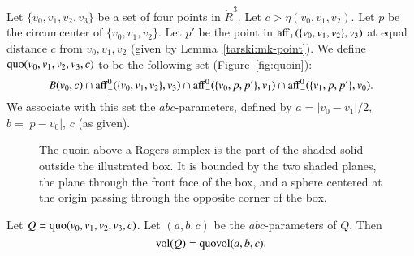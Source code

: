 \begin{definition}\label{def:quoin}
Let $\{v_0,v_1,v_2,v_3\}$ be a set of four points in $\ring{R}^3$.
Let $c>  \eta(v_0,v_1,v_2)$.  Let $p$ be the circumcenter
of $\{v_0,v_1,v_2\}$.  Let $p'$ be the point 
in ${\operatorname{aff}}_+(\{v_0,v_1,v_2\},v_3)$ at equal distance $c$
from $v_0,v_1,v_2$ (given by Lemma~\ref{tarski:mk-point}).
We define
${\operatorname{quo}}(v_0,v_1,v_2,v_3,c)$ to be the following set 
(Figure~\ref{fig:quoin}):
   $$
   B(v_0,c) \cap {\operatorname{aff}}_+^0(\{v_0,v_1,v_2\},v_3)
   \cap {\operatorname{aff}}_-^0(\{v_0,p,p'\},v_1) \cap
   {\operatorname{aff}}_-^0(\{v_1,p,p'\},v_0).
   $$
We associate with this set the $abc$-parameters, defined
by $a = |v_0-v_1|/2$, $b=|p-v_0|$, $c$ (as given).
\end{definition}

\begin{figure}[htb]
  \centering
  \caption{The quoin above a Rogers simplex is the part of the
  shaded solid outside
   the illustrated box.  It is bounded by the two
  shaded planes, the plane through
   the front face of the box, and a sphere
   centered at the origin passing through the opposite corner of the box.}
\end{figure}



\begin{lemma}
Let $Q={\operatorname{quo}}(v_0,v_1,v_2,v_3,c)$. Let $(a,b,c)$ be the
$abc$-parameters of $Q$.  
Then $${\operatorname{vol}}(Q) = {\operatorname{quovol}}(a,b,c).$$
%
\end{lemma}

